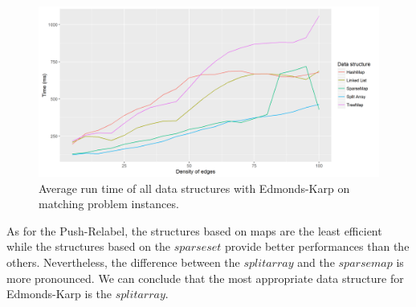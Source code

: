 \begin{figure}[H]
\begin{center}
\includegraphics[scale=0.5]{images/results/ekmeanmatching.png}
\caption{Average run time of all data structures with Edmonds-Karp on matching problem instances.}
\label{fig:ekmeanmatching}
\end{center}
\end{figure}
As for the Push-Relabel, the structures based on maps are the least efficient while the structures based on the $sparse set$ provide better performances than the others. Nevertheless, the difference between the $split array$ and the $sparse map$ is more pronounced. 
We can conclude that the most appropriate data structure for Edmonds-Karp is the $split array$.
